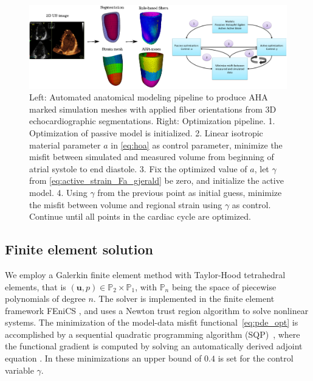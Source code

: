 \documentclass[times]{elsarticle}
\newcommand{\uvec}{\mathbf{u}}
\begin{document}
\begin{figure}[htbp]
\centering
    \includegraphics[width=\textwidth]{models}
\caption{Left: Automated anatomical modeling pipeline to produce AHA
  marked simulation meshes with applied fiber orientations from 3D
  echocardiographic segmentations. Right: Optimization
  pipeline. 1. Optimization of passive model is
  initialized. 2. Linear isotropic material parameter
  $a$ in \eqref{eq:hoa} as control parameter, minimize the misfit
  between simulated and measured volume from beginning of atrial
  systole to end diastole. 3. Fix the optimized value of $a$, let
  $\gamma$ from \eqref{eq:active_strain_Fa_gjerald} be zero,
  and initialize the active model. 4. Using $\gamma$ from
  the previous point as initial guess, minimize the misfit between
  volume and regional strain using $\gamma$ as control. Continue until
  all points in the cardiac cycle are optimized.}
\label{fig:pipeline}
\end{figure}

\subsection{Finite element solution}
We employ a Galerkin finite element method with Taylor-Hood
tetrahedral elements, that is $(\uvec, p) \in \mathbb{P}_2 \times
\mathbb{P}_1 $, with $\mathbb{P}_n$ being the space of piecewise
polynomials of degree $n$.
The solver is implemented in the finite element framework FEniCS
\cite{logg2012automated}, and uses a Newton trust region algorithm
\cite{PETScPackage} to solve nonlinear systems. The minimization of the
model-data misfit functional~\eqref{eq:pde_opt} is accomplished by a sequential
quadratic programming algorithm (SQP)~\cite{kraft1988software}, where
the functional gradient is computed by solving an automatically derived adjoint
equation \cite{farrell2013automated}. In these minimizations an upper bound of $0.4$ is
set for the control variable $\gamma$.
\end{document}
